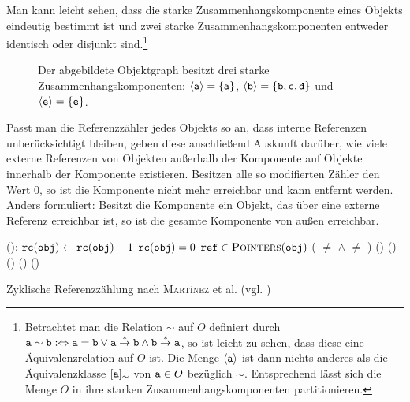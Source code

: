 Man kann leicht sehen, dass die starke Zusammenhangskomponente eines Objekts eindeutig bestimmt ist und zwei starke Zusammenhangskomponenten entweder identisch oder disjunkt sind.\footnote{Betrachtet man die Relation $\sim$ auf $O$ definiert durch $\texttt{a} \sim \texttt{b} :\Leftrightarrow \texttt{a} = \texttt{b} \vee \texttt{a} \overset{*}{\rightarrow} \texttt{b} \wedge \texttt{b} \overset{*}{\rightarrow} \texttt{a}$, so ist leicht zu sehen, dass diese eine Äquivalenzrelation auf $O$ ist. Die Menge $\left\langle\texttt{a}\right\rangle$ ist dann nichts anderes als die Äquivalenzklasse $[\texttt{a}]_{\sim}$ von $\texttt{a} \in O$ bezüglich $\sim$. Entsprechend lässt sich die Menge $O$ in ihre starken Zusammenhangskomponenten partitionieren.}

\begin{figure}[h]
	\centering
	
	\caption[Beispiel für starke Zusammenhangskomponenten]{Der abgebildete Objektgraph besitzt drei starke Zusammenhangskomponenten: $\left\langle\texttt{a}\right\rangle = \{\texttt{a}\}$, $\left\langle\texttt{b}\right\rangle = \{\texttt{b}, \texttt{c}, \texttt{d}\}$ und $\left\langle\texttt{e}\right\rangle = \{\texttt{e}\}$.}
	\label{fig:rc-scc}
\end{figure}

Passt man die Referenzzähler jedes Objekts so an, dass interne Referenzen unberücksichtigt bleiben, geben diese anschließend Auskunft darüber, wie viele externe Referenzen von Objekten außerhalb der Komponente auf Objekte innerhalb der Komponente existieren.
Besitzen alle so modifierten Zähler den Wert $0$, so ist die Komponente nicht mehr erreichbar und kann entfernt werden.
Anders formuliert: Besitzt die Komponente ein Objekt, das über eine externe Referenz erreichbar ist, so ist die gesamte Komponente von außen erreichbar.

\begin{algorithm}[h]
\begin{algorithmic}[1]
	\State {}():
	\State \quad $\texttt{rc}(\texttt{obj}) \gets \texttt{rc}(\texttt{obj}) - 1$
	\State \quad \IF $\texttt{rc}(\texttt{obj}) = 0$
	\State \quad \quad \FOREACH $\texttt{ref} \in \textsc{Pointers}(\texttt{obj})$
	\State \quad \quad \quad \IF ( $\neq$ \Null $\wedge$  $\neq$ )
	\State \quad \quad \quad \quad {}()
	\State \quad \quad {}()
	\State \quad \ELSE
	\State \quad \quad {}()		
	\State \quad \quad {}()		
	\State \quad \quad {}()	
\end{algorithmic}
\caption[Zyklische Referenzzählung]{Zyklische Referenzzählung nach \textsc{Martínez} et al. (vgl. \cite[S. 32]{martinez1990})}
\label{algo:cyclic-rc}
\end{algorithm}

